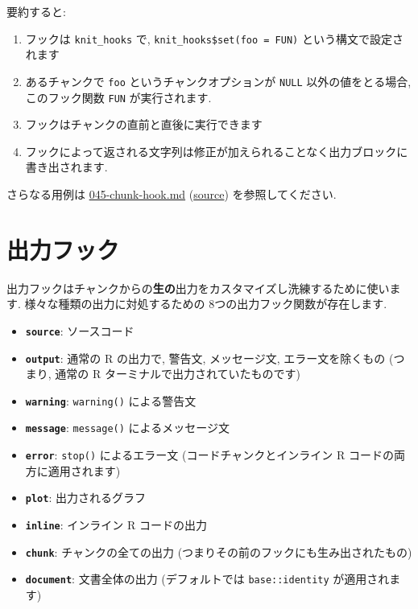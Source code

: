 \documentclass[
  xelatex,ja=standard,jafont=noto]{bxjsreport}
\providecommand{\tightlist}{%
  \setlength{\itemsep}{0pt}\setlength{\parskip}{0pt}}
\begin{document}
要約すると:

\begin{enumerate}
\def\labelenumi{\arabic{enumi}.}
\tightlist
\item
  フックは \texttt{knit\_hooks} で,
  \texttt{knit\_hooks\$set(foo\ =\ FUN)} という構文で設定されます
\item
  あるチャンクで \texttt{foo} というチャンクオプションが \texttt{NULL}
  以外の値をとる場合, このフック関数 \texttt{FUN} が実行されます.
\item
  フックはチャンクの直前と直後に実行できます
\item
  フックによって返される文字列は修正が加えられることなく出力ブロックに書き出されます.
\end{enumerate}

さらなる用例は
\href{https://github.com/yihui/knitr-examples/blob/master/045-chunk-hook.md}{045-chunk-hook.md}
(\href{https://github.com/yihui/knitr-examples/blob/master/045-chunk-hook.Rmd}{source})
を参照してください.

\hypertarget{ux51faux529bux30d5ux30c3ux30af}{%
\section{出力フック}\label{ux51faux529bux30d5ux30c3ux30af}}

出力フックはチャンクからの\textbf{生の}出力をカスタマイズし洗練するために使います.
様々な種類の出力に対処するための 8つの出力フック関数が存在します.

\begin{itemize}
\tightlist
\item
  \textbf{\texttt{source}}: ソースコード
\item
  \textbf{\texttt{output}}: 通常の R の出力で, 警告文, メッセージ文,
  エラー文を除くもの (つまり, 通常の R
  ターミナルで出力されていたものです)
\item
  \textbf{\texttt{warning}}: \texttt{warning()} による警告文
\item
  \textbf{\texttt{message}}: \texttt{message()} によるメッセージ文
\item
  \textbf{\texttt{error}}: \texttt{stop()} によるエラー文
  (コードチャンクとインライン R コードの両方に適用されます)
\item
  \textbf{\texttt{plot}}: 出力されるグラフ
\item
  \textbf{\texttt{inline}}: インライン R コードの出力
\item
  \textbf{\texttt{chunk}}: チャンクの全ての出力
  (つまりその前のフックにも生み出されたもの)
\item
  \textbf{\texttt{document}}: 文書全体の出力 (デフォルトでは
  \texttt{base::identity} が適用されます)
\end{itemize}
\end{document}
